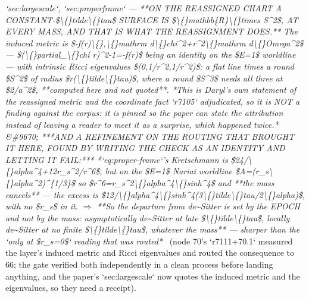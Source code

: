 \begin{description}
\textit{`sec:largescale`, `sec:properframe` ---  **ON THE REASSIGNED CHART A CONSTANT-\$\textbackslash\{\}tilde\textbackslash\{\}tau\$ SURFACE IS \$\textbackslash\{\}mathbb\{R\}\textbackslash\{\}times S\textasciicircum{}2\$, AT EVERY MASS, AND THAT IS WHAT THE REASSIGNMENT DOES.** The induced metric is \$-f(r)\textbackslash\{\},\textbackslash\{\}mathrm d\textbackslash\{\}chi\textasciicircum{}2+r\textasciicircum{}2\textbackslash\{\}mathrm d\textbackslash\{\}Omega\textasciicircum{}2\$ --- \$(\textbackslash\{\}partial\_\textbackslash\{\}chi r)\textasciicircum{}2-1=-f(r)\$ being an identity on the \$E=1\$ worldline --- with intrinsic Ricci eigenvalues \$(0,1/r\textasciicircum{}2,1/r\textasciicircum{}2)\$: a flat line times a round \$S\textasciicircum{}2\$ of radius \$r(\textbackslash\{\}tilde\textbackslash\{\}tau)\$, where a round \$S\textasciicircum{}3\$ needs all three at \$2/a\textasciicircum{}2\$, **computed here and not quoted**.  *This is Daryl's own statement of the reassigned metric and the coordinate fact `r7105` adjudicated, so it is NOT a finding against the corpus: it is pinned so the paper can state the attribution instead of leaving a reader to meet it as a surprise, which happened twice.* \&\#9670;  ***AND A REFINEMENT ON THE ROUTING THAT BROUGHT IT HERE, FOUND BY WRITING THE CHECK AS AN IDENTITY AND LETTING IT FAIL:*** *`eq:proper-frame`'s Kretschmann is \$24/\textbackslash\{\}alpha\textasciicircum{}4+12r\_s\textasciicircum{}2/r\textasciicircum{}6\$, but on the \$E=1\$ Nariai worldline \$A=(r\_s\textbackslash\{\}alpha\textasciicircum{}2)\textasciicircum{}\{1/3\}\$ so \$r\textasciicircum{}6=r\_s\textasciicircum{}2\textbackslash\{\}alpha\textasciicircum{}4\textbackslash\{\}sinh\textasciicircum{}4\$ and **the mass cancels** --- the excess is \$12/\textbackslash\{\}alpha\textasciicircum{}4\textbackslash\{\}sinh\textasciicircum{}4(3\textbackslash\{\}tilde\textbackslash\{\}tau/2\textbackslash\{\}alpha)\$, with no \$r\_s\$ in it. \ensuremath{\Rightarrow} **So the departure from de\textasciitilde{}Sitter is set by the EPOCH and not by the mass: asymptotically de\textasciitilde{}Sitter at late \$\textbackslash\{\}tilde\textbackslash\{\}tau\$, locally de\textasciitilde{}Sitter at no finite \$\textbackslash\{\}tilde\textbackslash\{\}tau\$, whatever the mass** --- sharper than the `only at \$r\_s=0\$` reading that was routed*} \ (node 70's `r7111+70.1` measured the layer's induced metric and Ricci eigenvalues and routed the consequence to 66; the gate verified both independently in a clean process before landing anything, and the paper's `sec:largescale` now quotes the induced metric and the eigenvalues, so they need a receipt). 

\end{description}
